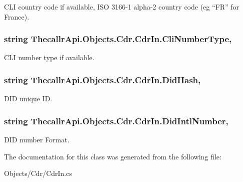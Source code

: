 C\+L\+I country code if available, I\+S\+O 3166-\/1 alpha-\/2 country code (eg “\+F\+R” for France). 

\hypertarget{class_thecallr_api_1_1_objects_1_1_cdr_1_1_cdr_in_a73d9fda683eda52039acecd97aa96053}{
\subsubsection[{Cli\+Number\+Type}]{\setlength{\rightskip}{0pt plus 5cm}string Thecallr\+Api.\+Objects.\+Cdr.\+Cdr\+In.\+Cli\+Number\+Type\hspace{0.3cm}{\ttfamily [get]}, {\ttfamily [set]}}}\label{class_thecallr_api_1_1_objects_1_1_cdr_1_1_cdr_in_a73d9fda683eda52039acecd97aa96053}


C\+L\+I number type if available. 

\hypertarget{class_thecallr_api_1_1_objects_1_1_cdr_1_1_cdr_in_a7dbf57d93e1de425a7b111a51d6b2a59}{
\subsubsection[{Did\+Hash}]{\setlength{\rightskip}{0pt plus 5cm}string Thecallr\+Api.\+Objects.\+Cdr.\+Cdr\+In.\+Did\+Hash\hspace{0.3cm}{\ttfamily [get]}, {\ttfamily [set]}}}\label{class_thecallr_api_1_1_objects_1_1_cdr_1_1_cdr_in_a7dbf57d93e1de425a7b111a51d6b2a59}


D\+I\+D unique I\+D. 

\hypertarget{class_thecallr_api_1_1_objects_1_1_cdr_1_1_cdr_in_a9a877205a0b724cc3864a3f3350f1c71}{
\subsubsection[{Did\+Intl\+Number}]{\setlength{\rightskip}{0pt plus 5cm}string Thecallr\+Api.\+Objects.\+Cdr.\+Cdr\+In.\+Did\+Intl\+Number\hspace{0.3cm}{\ttfamily [get]}, {\ttfamily [set]}}}\label{class_thecallr_api_1_1_objects_1_1_cdr_1_1_cdr_in_a9a877205a0b724cc3864a3f3350f1c71}


D\+I\+D number Format. 



The documentation for this class was generated from the following file\+:\begin{DoxyCompactItemize}
\item 
Objects/\+Cdr/Cdr\+In.\+cs\end{DoxyCompactItemize}
